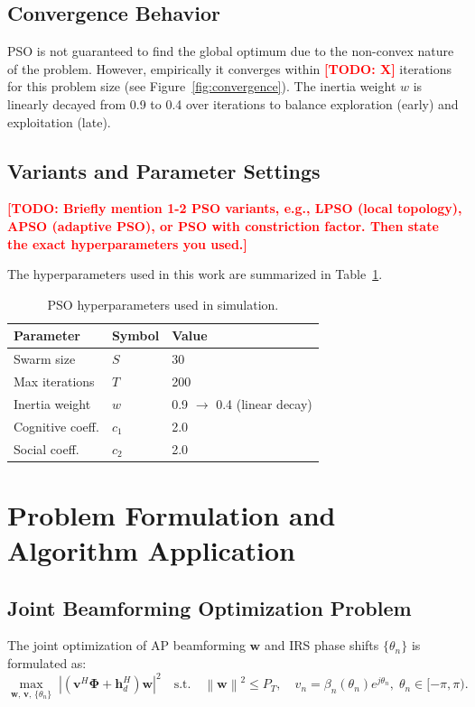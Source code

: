 \documentclass[12pt, a4paper]{article}
\newcommand{\vect}[1]{\mathbf{#1}}          %
\newcommand{\norm}[1]{\left\|#1\right\|}    %
\newcommand{\abs}[1]{\left|#1\right|}       %
\newcommand{\TODO}[1]{\textcolor{red}{\textbf{[TODO: #1]}}}  %
\begin{document}
\subsection{Convergence Behavior}
PSO is not guaranteed to find the global optimum due to the non-convex nature
of the problem. However, empirically it converges within \TODO{X} iterations
for this problem size (see Figure~\ref{fig:convergence}). The inertia weight
$w$ is linearly decayed from 0.9 to 0.4 over iterations to balance exploration
(early) and exploitation (late).

\subsection{Variants and Parameter Settings}
\TODO{Briefly mention 1-2 PSO variants, e.g., LPSO (local topology), APSO
(adaptive PSO), or PSO with constriction factor. Then state the exact
hyperparameters you used.}

The hyperparameters used in this work are summarized in Table~\ref{tab:params}.

\begin{table}[H]
    \centering
    \caption{PSO hyperparameters used in simulation.}
    \label{tab:params}
    \begin{tabular}{lll}
        \toprule
        \textbf{Parameter} & \textbf{Symbol} & \textbf{Value} \\
        \midrule
        Swarm size          & $S$   & 30 \\
        Max iterations      & $T$   & 200 \\
        Inertia weight      & $w$   & 0.9 $\to$ 0.4 (linear decay) \\
        Cognitive coeff.    & $c_1$ & 2.0 \\
        Social coeff.       & $c_2$ & 2.0 \\
        \bottomrule
    \end{tabular}
\end{table}

\section{Problem Formulation and Algorithm Application}
\label{sec:optimization}

\subsection{Joint Beamforming Optimization Problem}
The joint optimization of AP beamforming $\vect{w}$ and IRS phase shifts
$\{\theta_n\}$ is formulated as:
\begin{equation}
    \max_{\vect{w},\,\vect{v},\,\{\theta_n\}}\;
        \abs{\left(\vect{v}^H\boldsymbol{\Phi} + \vect{h}_d^H\right)\vect{w}}^2
    \quad \text{s.t.} \quad
    \norm{\vect{w}}^2 \leq P_T, \quad
    v_n = \beta_n(\theta_n)e^{j\theta_n},\; \theta_n \in [-\pi,\pi).
    \label{eq:P0}
\end{equation}
\end{document}
